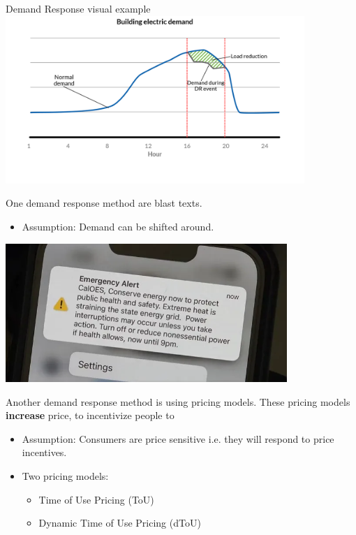 \documentclass{beamer}
\begin{document}
\begin{frame}{Demand Response visual example}
  \centering
  \includegraphics[width=0.85\textwidth]{images/demand-response.png}
\end{frame}

\begin{frame}{One demand response method are blast texts.}
  \begin{itemize}
    \item<+-> Assumption: Demand can be shifted around.
  \end{itemize}
  \centering
  \includegraphics[width=0.8\textwidth]{images/OES-power-text.png}
\end{frame}

\begin{frame}{Another demand response method is using pricing models.}
  These pricing models \textbf{increase} price, to incentivize people to 
  \begin{itemize}
    \item<+-> Assumption: Consumers are price sensitive i.e. they will respond to price incentives.
    \item<+-> Two pricing models:
    \begin{itemize}
      \item<+-> Time of Use Pricing (ToU)
      \item<+-> Dynamic Time of Use Pricing (dToU)
    \end{itemize}
  \end{itemize}
\end{frame}
\end{document}
